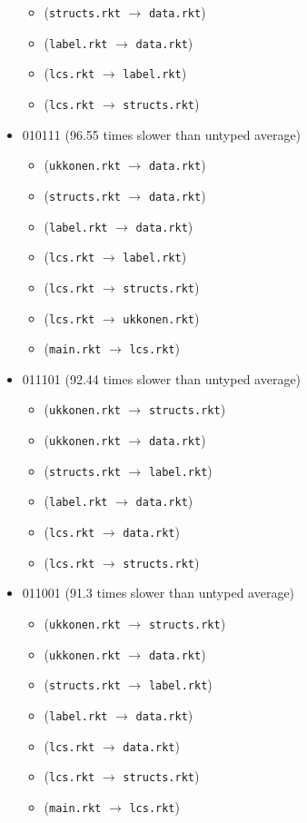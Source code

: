 \documentclass{article}
\newcommand{\mono}[1]{\texttt{#1}}
\begin{document}
\begin{itemize}
\begin{itemize}
  \item (\mono{structs.rkt} $\rightarrow$ \mono{data.rkt})
  \item (\mono{label.rkt} $\rightarrow$ \mono{data.rkt})
  \item (\mono{lcs.rkt} $\rightarrow$ \mono{label.rkt})
  \item (\mono{lcs.rkt} $\rightarrow$ \mono{structs.rkt})
  \end{itemize}
\item 010111 (96.55 times slower than untyped average)
  \begin{itemize}
  \item (\mono{ukkonen.rkt} $\rightarrow$ \mono{data.rkt})
  \item (\mono{structs.rkt} $\rightarrow$ \mono{data.rkt})
  \item (\mono{label.rkt} $\rightarrow$ \mono{data.rkt})
  \item (\mono{lcs.rkt} $\rightarrow$ \mono{label.rkt})
  \item (\mono{lcs.rkt} $\rightarrow$ \mono{structs.rkt})
  \item (\mono{lcs.rkt} $\rightarrow$ \mono{ukkonen.rkt})
  \item (\mono{main.rkt} $\rightarrow$ \mono{lcs.rkt})
  \end{itemize}
\item 011101 (92.44 times slower than untyped average)
  \begin{itemize}
  \item (\mono{ukkonen.rkt} $\rightarrow$ \mono{structs.rkt})
  \item (\mono{ukkonen.rkt} $\rightarrow$ \mono{data.rkt})
  \item (\mono{structs.rkt} $\rightarrow$ \mono{label.rkt})
  \item (\mono{label.rkt} $\rightarrow$ \mono{data.rkt})
  \item (\mono{lcs.rkt} $\rightarrow$ \mono{data.rkt})
  \item (\mono{lcs.rkt} $\rightarrow$ \mono{structs.rkt})
  \end{itemize}
\item 011001 (91.3 times slower than untyped average)
  \begin{itemize}
  \item (\mono{ukkonen.rkt} $\rightarrow$ \mono{structs.rkt})
  \item (\mono{ukkonen.rkt} $\rightarrow$ \mono{data.rkt})
  \item (\mono{structs.rkt} $\rightarrow$ \mono{label.rkt})
  \item (\mono{label.rkt} $\rightarrow$ \mono{data.rkt})
  \item (\mono{lcs.rkt} $\rightarrow$ \mono{data.rkt})
  \item (\mono{lcs.rkt} $\rightarrow$ \mono{structs.rkt})
  \item (\mono{main.rkt} $\rightarrow$ \mono{lcs.rkt})
  \end{itemize}


\end{itemize}
\end{document}
